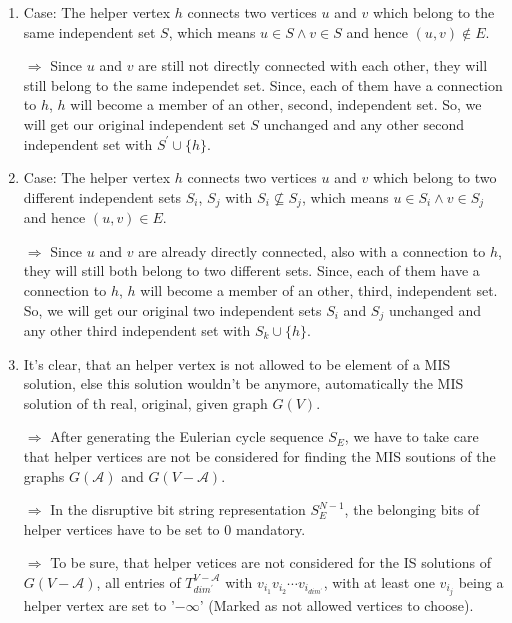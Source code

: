 \documentclass{article}
\newtheorem*{theorem A}{Theorem A}
\newtheorem*{theorem B}{N\"olker's Theorem}
\theoremstyle{remark}
\theoremstyle{remark}
\begin{document}
\begin{enumerate}
    \item Case: The helper vertex $h$ connects two vertices $u$ and $v$ which belong to the same independent set $S$, which means $u \in S \wedge v \in S$ and hence $\left(u,v\right) \notin E$.

        \vspace{0.3cm}
        $\Rightarrow$ Since $u$ and $v$ are still not directly connected with each other, they will still belong to the same independet set. Since, each of them have a connection to $h$, $h$ will become a member of an other, second, independent set. So, we will get our original independent set $S$ unchanged and any other second independent set with $S^{\prime} \cup \{ h \}$.

    \item Case: The helper vertex $h$ connects two vertices $u$ and $v$ which belong to two different independent sets $S_{i}$, $S_{j}$ with $S_{i} \nsubseteq S_{j}$, which means $u \in S_{i} \wedge v \in S_{j}$ and hence $\left(u,v\right) \in E$.

        \vspace{0.3cm}
        $\Rightarrow$ Since $u$ and $v$ are already directly connected, also with a connection to $h$, they will still both belong to two different sets. Since, each of them have a connection to $h$, $h$ will become a member of an other, third, independent set. So, we will get our original two independent sets $S_{i}$ and $S_{j}$ unchanged and any other third independent set with $S_{k} \cup \{ h \}$.

    \item It's clear, that an helper vertex is not allowed to be element of a MIS solution, else this solution wouldn't be anymore, automatically the MIS solution of th real, original, given graph $G\left(V\right)$.

        \vspace{0.3cm}
        $\Rightarrow$ After generating the Eulerian cycle sequence $S_{E}$, we have to take care that helper vertices are not be considered for finding the MIS soutions of the graphs $G\left(\mathcal{A}\right)$ and $G\left(V - \mathcal{A}\right)$.

        \vspace{0.3cm}
        $\Rightarrow$ In the disruptive bit string representation $S_{E}^{N-1}$, the belonging bits of helper vertices have to be set to $0$ mandatory.

        \vspace{0.3cm}
        $\Rightarrow$ To be sure, that helper vetices are not considered for the IS solutions of $G\left(V - \mathcal{A}\right)$, all entries of $T^{V - \mathcal{A}}_{dim^{\prime}}$ with $v_{i_{1}} v_{i_{2}} \cdots v_{i_{dim^{\prime}}}$, with at least one $v_{i_{j}}$ being a helper vertex are set to '$-\infty$' (Marked as not allowed vertices to choose).


\end{enumerate}
\end{document}
